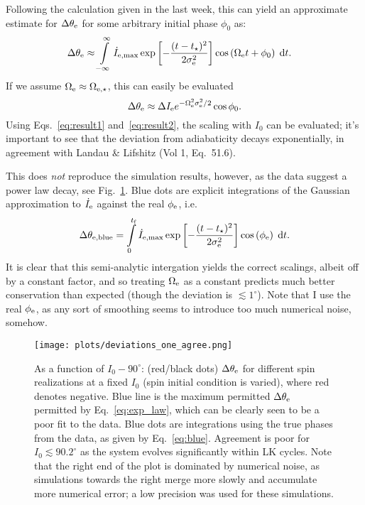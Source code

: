 \documentclass[11pt,
        usenames, %
        dvipsnames %
    ]{article}
\newcommand*{\p}[1]{\left(#1\right)}
\newcommand*{\s}[1]{\left[#1\right]}
\begin{document}
Following the calculation given in the last week, this can yield an approximate
estimate for $\Delta \theta_{\rm e}$ for some arbitrary initial phase $\phi_0$
as:
\begin{align}
    \Delta \theta_{\rm e} &\approx \int\limits_{-\infty}^\infty
        \dot{I}_{\rm e, \max} \exp\s{
            -\frac{(t - t_\star)^2}{2\sigma_{\rm e}^2}} \cos \p{\Omega_{\rm e}t
            + \phi_0}\;\mathrm{d}t.
\end{align}
If we assume $\Omega_{\rm e} \approx \Omega_{\rm e, \star}$, this can easily be
evaluated
\begin{equation}
    \Delta \theta_{\rm e} \approx \Delta I_{\rm e}
        e^{-\Omega_{\rm e}^2 \sigma_{\rm e}^2 / 2} \cos
        \phi_0.\label{eq:exp_law}
\end{equation}
Using Eqs.~\eqref{eq:result1} and~\eqref{eq:result2}, the scaling with $I_0$ can
be evaluated; it's important to see that the deviation from adiabaticity decays
exponentially, in agreement with Landau \& Lifshitz (Vol 1, Eq.~51.6).

This does \emph{not} reproduce the simulation results, however, as the data
suggest a power law decay, see Fig.~\ref{fig:deviations}. Blue dots are explicit
integrations of the Gaussian approximation to $\dot{I}_{\rm e}$ against the real
$\phi_{\rm e}$, i.e.
\begin{equation}
    \Delta \theta_{\rm e, blue} = \int\limits_0^{t_{\rm f}}
        \dot{I}_{\rm e, \max} \exp\s{
            -\frac{(t - t_\star)^2}{2\sigma_{\rm e}^2}}
            \cos \p{\phi_{\rm e}}\;\mathrm{d}t.\label{eq:blue}
\end{equation}
It is clear that this semi-analytic intergation yields the correct scalings,
albeit off by a constant factor, and so treating $\Omega_{\rm e}$ as a constant
predicts much better conservation than expected (though the deviation is
$\lesssim 1^\circ$). Note that I use the real $\phi_{\rm e}$, as any sort of
smoothing seems to introduce too much numerical noise, somehow.
\begin{figure}
    \centering
    \texttt{[image: plots/deviations\_one\_agree.png]}
    \caption{As a function of $I_0 - 90^\circ$: (red/black dots) $\Delta
    \theta_{\rm e}$ for different spin realizations at a fixed $I_0$ (spin
    initial condition is varied), where red denotes negative. Blue line is the
    maximum permitted $\Delta \theta_{\rm e}$ permitted by
    Eq.~\eqref{eq:exp_law}, which can be clearly seen to be a poor fit to the
    data. Blue dots are integrations using the true phases from the data, as
    given by Eq.~\eqref{eq:blue}. Agreement is poor for $I_0 \lesssim
    90.2^\circ$ as the system evolves significantly within LK cycles. Note that
    the right end of the plot is dominated by numerical noise, as simulations
    towards the right merge more slowly and accumulate more numerical error; a
    low precision was used for these simulations.}\label{fig:deviations}
\end{figure}
\end{document}
